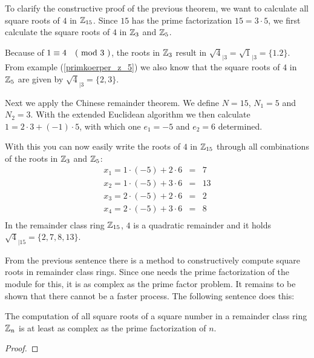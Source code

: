\begin{example} To clarify the constructive proof of the previous theorem, we want to calculate all square roots of $ 4 $ in $ \mathbb{Z}_{15} $. Since $ 15 $ has the prime factorization $ 15 = 3 \cdot 5 $, we first calculate the square roots of $ 4 $ in $ \mathbb{Z}_3 $ and $ \mathbb{Z}_5 $.

Because of $ 1 \equiv 4 \quad \text{( mod } 3 \text{ )} $, the roots in $ \mathbb{Z}_3 $ result in $ \sqrt{4} _{| 3} = \sqrt{1} _{| 3} = \{ 1.2 \} $. From example (\ref{primkoerper_z_5}) we also know that the square roots of $ 4 $ in $ \mathbb{Z}_5 $ are given by $ \sqrt{4} _{| 3} = \{2,3 \} $.

Next we apply the Chinese remainder theorem. We define
$ N = 15 $, $ N_1 = 5 $ and $ N_2 = 3 $. With the extended Euclidean algorithm
we then calculate $ 1 = 2 \cdot 3 + (-1) \cdot 5 $, with which one
$ e_1 = -5 $ and $ e_2 = 6 $ determined.

With this you can now easily write the roots of $ 4 $ in $ \mathbb{Z}_{15} $ through all combinations of the roots in $ \mathbb{Z}_3 $ and $ \mathbb{Z}_5 $:
\begin{equation}
\begin{array}{rcl}
x_1 = 1 \cdot (-5) + 2 \cdot 6 & = & 7 \\
x_2 = 1 \cdot (-5) + 3 \cdot 6 & = & 13 \\
x_3 = 2 \cdot (-5) + 2 \cdot 6 & = & 2 \\
x_4 = 2 \cdot (-5) + 3 \cdot 6 & = & 8 \\
\end{array}
\end{equation}
In the remainder class ring $ \mathbb{Z}_{15} $, $ 4 $ is a quadratic remainder and it holds
$ \sqrt{4} _{| 15} = \{2,7,8,13 \} $.
\end{example}
From the previous sentence there is a method to constructively compute square roots in remainder class rings. Since one needs the prime factorization of the module for this, it is as complex as the prime factor problem. It remains to be shown that there cannot be a faster process. The following sentence does this:
\begin{theorem}
\label{theorem: square_roots_as_compl_as_factor}
The computation of all square roots of a square number in a remainder class ring $ \mathbb{Z}_n $ is at least as complex as the prime factorization of $ n $.
\end{theorem}
\begin{proof}
\end{proof}




